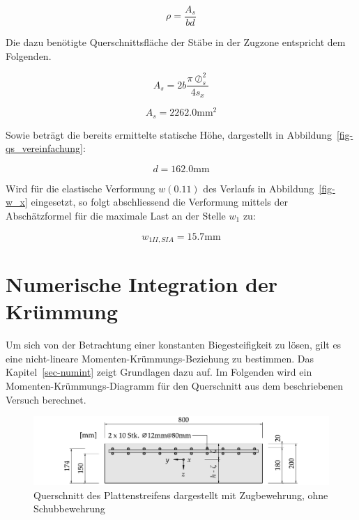 \documentclass[
  12pt,
  letterpaper,
  egregdoesnotlikesansseriftitles]{scrreprt}
\begin{document}
\begin{equation}\rho = \frac{A_{s}}{b d}\end{equation}

Die dazu benötigte Querschnittsfläche der Stäbe in der Zugzone
entspricht dem Folgenden.

\begin{equation}A_{s} = 2 b \frac{\pi \oslash_{s}^{2}}{4 s_{x}}\end{equation}

\begin{equation}A_{s} = 2262.0 \text{mm}^{2}\end{equation}

Sowie beträgt die bereits ermittelte statische Höhe, dargestellt in
Abbildung~\ref{fig-qs_vereinfachung}:

\begin{equation}d = 162.0 \text{mm}\end{equation}

Wird für die elastische Verformung \(w(0.11)\) des Verlaufs in
Abbildung~\ref{fig-w_x} eingesetzt, so folgt abschliessend die
Verformung mittels der Abschätzformel für die maximale Last an der
Stelle \(w_1\) zu:

\begin{equation}w_{1 II,SIA} = 15.7 \text{mm}\end{equation}

\hypertarget{numerische-integration-der-kruxfcmmung}{%
\section{Numerische Integration der
Krümmung}\label{numerische-integration-der-kruxfcmmung}}

Um sich von der Betrachtung einer konstanten Biegesteifigkeit zu lösen,
gilt es eine nicht-lineare Momenten-Krümmungs-Beziehung zu bestimmen.
Das Kapitel~\ref{sec-numint} zeigt Grundlagen dazu auf. Im Folgenden
wird ein Momenten-Krümmungs-Diagramm für den Querschnitt aus dem
beschriebenen Versuch berechnet.

\begin{figure}[H]

{\centering \includegraphics{index_files/mediabag/../images/QS_Versuch_A3.pdf}

}

\caption{\label{fig-qs_a3}Querschnitt des Plattenstreifens dargestellt
mit Zugbewehrung, ohne Schubbewehrung}

\end{figure}
\end{document}
